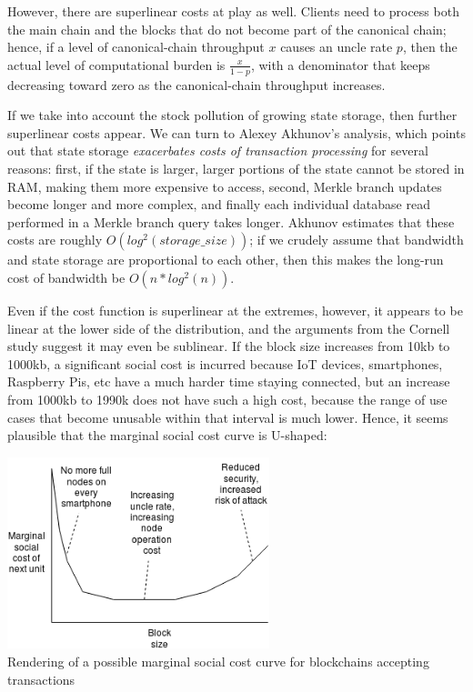 \documentclass[12pt, final]{article}
\begin{document}
However, there are superlinear costs at play as well. Clients need to process both the main chain and the blocks that do not become part of the canonical chain; hence, if a level of canonical-chain throughput $x$ causes an uncle rate $p$, then the actual level of computational burden is $\frac{x}{1-p}$, with a denominator that keeps decreasing toward zero as the canonical-chain throughput increases.

If we take into account the stock pollution of growing state storage, then further superlinear costs appear. We can turn to Alexey Akhunov's analysis, which points out that state storage \emph{exacerbates costs of transaction processing} for several reasons: first, if the state is larger, larger portions of the state cannot be stored in RAM, making them more expensive to access, second, Merkle branch updates become longer and more complex, and finally each individual database read performed in a Merkle branch query takes longer. Akhunov estimates that these costs are roughly $O(log^2(storage\_size))$; if we crudely assume that bandwidth and state storage are proportional to each other, then this makes the long-run cost of bandwidth be $O(n * log^2(n))$.

Even if the cost function is superlinear at the extremes, however, it appears to be linear at the lower side of the distribution, and the arguments from the Cornell study suggest it may even be sublinear. If the block size increases from 10kb to 1000kb, a significant social cost is incurred because IoT devices, smartphones, Raspberry Pis, etc have a much harder time staying connected, but an increase from 1000kb to 1990k does not have such a high cost, because the range of use cases that become unusable within that interval is much lower. Hence, it seems plausible that the marginal social cost curve is U-shaped:

\begin{center}
\includegraphics[width=3in]{total_social_cost.png} \\
\footnotesize{Rendering of a possible marginal social cost curve for blockchains accepting transactions}
\label{fig:three}
\end{center}
\end{document}
